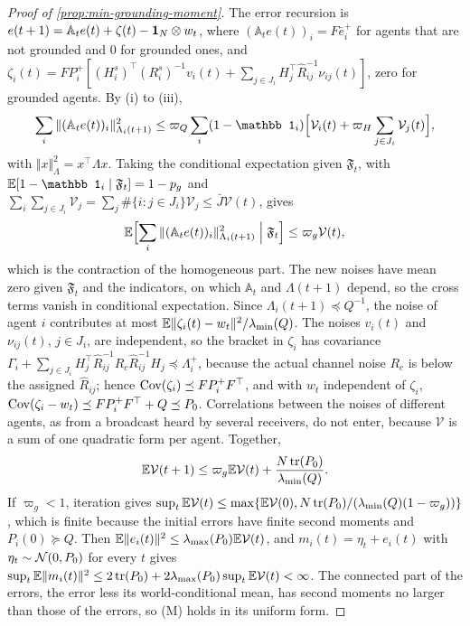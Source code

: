 \begin{proof}[Proof of \cref{prop:min-grounding-moment}]
The error recursion is $e(t+1)=\mathbb A_te(t)+\zeta(t)-\mathbf{1}_N\otimes w_t$, where $(\mathbb A_te(t))_i=F\bar e^+_i$ for agents that are not grounded and $0$ for grounded ones, and $\zeta_i(t)=FP^+_i[(H^s_i)^\top(R^s_i)^{-1}v_i(t)+\sum_{j\in J_i}H_j^\top\hat R_{ij}^{-1}\nu_{ij}(t)]$, zero for grounded agents. By (i) to (iii),
\[
\sum_i\Vert(\mathbb A_te(t))_i\Vert^2_{\Lambda_i(t+1)}\le\varpi_Q\sum_i(1-\mathbb 1_i)\Bigl[\mathcal V_i(t)+\varpi_H\sum_{j\in J_i}\mathcal V_j(t)\Bigr],
\]
with $\Vert x\Vert^2_{\Lambda}=x^\top\Lambda x$. Taking the conditional expectation given $\mathfrak F_t$, with $\E[1-\mathbb 1_i\mid\mathfrak F_t]=1-p_g$ and $\sum_i\sum_{j\in J_i}\mathcal V_j=\sum_j\#\{i:j\in J_i\}\mathcal V_j\le\bar J\mathcal V(t)$, gives
\[
\mathbb{E}\Bigl[\sum_i\Vert(\mathbb A_te(t))_i\Vert^2_{\Lambda_i(t+1)}\Bigm|\mathfrak F_t\Bigr]\le\varpi_g\mathcal V(t),
\]
which is the contraction of the homogeneous part. The new noises have mean zero given $\mathfrak F_t$ and the indicators, on which $\mathbb A_t$ and $\Lambda(t+1)$ depend, so the cross terms vanish in conditional expectation. Since $\Lambda_i(t+1)\preceq Q^{-1}$, the noise of agent $i$ contributes at most $\mathbb{E}\Vert\zeta_i(t)-w_t\Vert^2/\lambda_{\min}(Q)$. The noises $v_i(t)$ and $\nu_{ij}(t)$, $j\in J_i$, are independent, so the bracket in $\zeta_i$ has covariance $\Gamma_i+\sum_{j\in J_i}H_j^\top\hat R_{ij}^{-1}R_c\hat R_{ij}^{-1}H_j\preceq\Lambda^+_i$, because the actual channel noise $R_c$ is below the assigned $\hat R_{ij}$; hence $\operatorname{Cov}(\zeta_i)\preceq FP^+_iF^\top$, and with $w_t$ independent of $\zeta_i$, $\operatorname{Cov}(\zeta_i-w_t)\preceq FP^+_iF^\top+Q\preceq P_0$. Correlations between the noises of different agents, as from a broadcast heard by several receivers, do not enter, because $\mathcal V$ is a sum of one quadratic form per agent. Together,
\[
\mathbb{E}\mathcal V(t+1)\le\varpi_g\mathbb{E}\mathcal V(t)+\frac{N\operatorname{tr}(P_0)}{\lambda_{\min}(Q)}.
\]
If $\varpi_g<1$, iteration gives $\sup_t\mathbb{E}\mathcal V(t)\le\max\{\mathbb{E}\mathcal V(0),N\operatorname{tr}(P_0)/(\lambda_{\min}(Q)(1-\varpi_g))\}$, which is finite because the initial errors have finite second moments and $P_i(0)\succeq Q$. Then $\mathbb{E}\Vert e_i(t)\Vert^2\le\lambda_{\max}(P_0)\mathbb{E}\mathcal V(t)$, and $m_i(t)=\eta_t+e_i(t)$ with $\eta_t\sim\mathcal{N}(0,P_0)$ for every $t$ gives $\sup_t\mathbb{E}\Vert m_i(t)\Vert^2\le2\operatorname{tr}(P_0)+2\lambda_{\max}(P_0)\sup_t\mathbb{E}\mathcal V(t)<\infty$. The connected part of the errors, the error less its world-conditional mean, has second moments no larger than those of the errors, so (M) holds in its uniform form.
\end{proof}
